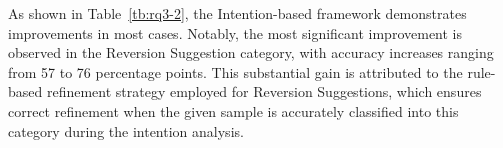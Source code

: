 



As shown in Table~\ref{tb:rq3-2}, the Intention-based framework demonstrates improvements in most cases. Notably, the most significant improvement is observed in the Reversion Suggestion category, with accuracy increases ranging from 57 to 76 percentage
points. This substantial gain is attributed to the rule-based refinement strategy employed for Reversion Suggestions, which ensures correct refinement when the given sample is accurately classified into this category during the intention analysis.

